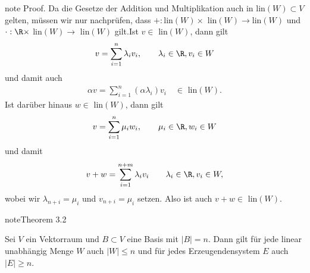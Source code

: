 \documentclass[letterpaper,10pt,english]{jupyterBook}
\begin{document}
\begin{sphinxadmonition}{note}
Proof.  Da die Gesetze der Addition und Multiplikation auch in lin\((W) \subset V\) gelten, müssen wir nur nachprüfen, dass \(+:\)lin\((W) \times\) lin\((W) \rightarrow \)lin\((W)\) und \(\cdot:\R \times\) lin\((W) \rightarrow\) lin\((W)\) gilt.Ist \(v \in \) lin\((W)\), dann gilt
\begin{equation*}
\begin{split} v = \sum_{i=1}^n \lambda_i v_i, \qquad \lambda_i \in \R, v_i \in W\end{split}
\end{equation*}
und
damit auch
\begin{equation*}
\begin{split} \alpha v = \sum_{i=1}^n (\alpha \lambda_i) v_i \quad \in \text{ lin}(W).\end{split}
\end{equation*}
Ist darüber hinaus \(w \in \) lin\((W)\), dann gilt
\begin{equation*}
\begin{split} v = \sum_{i=1}^n \mu_i w_i, \qquad \mu_i \in \R, w_i \in W\end{split}
\end{equation*}
und
damit
\begin{equation*}
\begin{split} v+ w = \sum_{i=1}^{n+m} \lambda_i v_i \qquad \lambda_i \in \R, v_i \in W,\end{split}
\end{equation*}
wobei wir \(\lambda_{n+i} = \mu_i\) und \(v_{n+i} = \mu_i\) setzen. Also ist auch \(v+w \in \) lin\((W)\).
\end{sphinxadmonition}
\label{vektorraeume/vektorraeume:theorem-10}
\begin{sphinxadmonition}{note}{Theorem 3.2}



Sei \(V\) ein Vektorraum und \(B \subset V\) eine Basis mit \(|B|=n\). Dann gilt für jede linear unabhängig Menge \(W\) auch \(|W| \leq n\) und für jedes Erzeugendensystem \(E\) auch \(|E| \geq n\).
\end{sphinxadmonition}
\end{document}
